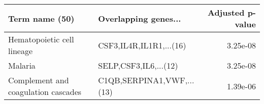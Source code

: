 \begin{tabular}{llr}
\toprule
                     Term name (50) &      Overlapping genes... &  Adjusted p-value \\
\midrule
         Hematopoietic cell lineage &   CSF3,IL4R,IL1R1,...(16) &          3.25e-08 \\
                            Malaria &     SELP,CSF3,IL6,...(12) &          3.25e-08 \\
Complement and coagulation cascades & C1QB,SERPINA1,VWF,...(13) &          1.39e-06 \\
\bottomrule
\end{tabular}
